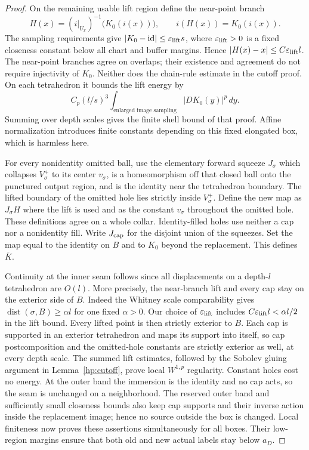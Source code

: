 \documentclass[11pt]{article}
\numberwithin{equation}{section}
\theoremstyle{definition}
\theoremstyle{remark}
\begin{document}
\begin{proof}
On the remaining usable lift region define the near-point branch
\begin{equation}\label{qt:central-lift}
 H(x)=(i|_{U_x})^{-1}\bigl(K_0(i(x))\bigr),
 \qquad i(H(x))=K_0(i(x)).
\end{equation}
The sampling requirements give
$|K_0-\mathrm{id}|\le\varepsilon_{\rm lift}s$, where
$\varepsilon_{\rm lift}>0$ is a fixed closeness constant below all
chart and buffer margins.  Hence
$|H(x)-x|\le C\varepsilon_{\rm lift}l$.
The near-point branches agree on overlaps;
their existence and agreement do not require injectivity of $K_0$.
Neither does the chain-rule estimate in the cutoff proof.  On each
tetrahedron it bounds the lift energy by
\[
 C_p(l/s)^3
       \int_{\text{enlarged image sampling}} |DK_0(y)|^p\,dy.
\]
Summing over depth scales gives the finite shell bound of that
proof.  Affine normalization introduces finite constants depending
on this fixed elongated box, which is harmless here.

For every nonidentity omitted ball, use the elementary forward
squeeze $J_{\sigma}$ which collapses $V_{\sigma}^+$ to its center $v_{\sigma}$, is a
homeomorphism off that closed ball onto the punctured output
region, and is the identity near the tetrahedron boundary.
The lifted boundary of the omitted hole lies strictly inside
$V_{\sigma}^+$.  Define the new map as $J_{\sigma}H$ where the lift is used and
as the constant $v_{\sigma}$ throughout the omitted hole.  These definitions
agree on a whole collar.  Identity-filled holes use neither a cap
nor a nonidentity fill.  Write $J_{\rm cap}$ for the disjoint union
of the squeezes.  Set the map equal to the identity on $B$ and to
$K_0$ beyond the replacement.  This defines $\overline K$.

Continuity at the inner seam follows since all displacements on a
depth-$l$ tetrahedron are $O(l)$.  More precisely, the near-branch
lift and every cap stay on the exterior side of $B$.  Indeed the
Whitney scale comparability gives $\operatorname{dist}(\sigma,B)\geq\alpha l$ for one
fixed $\alpha>0$.  Our choice of $\varepsilon_{\rm lift}$ includes
$C\varepsilon_{\rm lift}l<\alpha l/2$ in the lift bound.
Every lifted point is then strictly exterior to $B$.  Each
cap is supported in an exterior tetrahedron and maps its support into
itself, so cap postcomposition and the omitted-hole constants are
strictly exterior as well, at every depth scale.  The summed lift estimates, followed by the Sobolev gluing argument in
Lemma~\ref{hp:cutoff}, prove local $W^{1,p}$ regularity.  Constant
holes cost no energy.  At the outer band the immersion is the
identity and no cap acts, so the seam is unchanged on a neighborhood.
The reserved outer band and sufficiently small closeness bounds also
keep cap supports and their inverse action inside the replacement
image; hence no source outside the box is changed.  Local finiteness
now proves these assertions simultaneously for all boxes.  Their
low-region margins ensure that both old and new actual labels stay
below $a_D$.


\end{proof}
\end{document}
